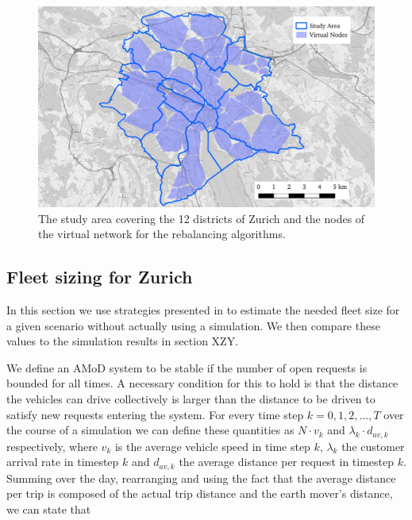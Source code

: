 \begin{figure}[h]
\begin{center}\includegraphics[width=1.0\textwidth]{figures/map.pdf}\end{center}
\caption{The study area covering the 12 districts of Zurich and the nodes of the virtual network for the rebalancing algorithms.}
\label{fig:distancePlot}
\end{figure}

\subsection{Fleet sizing for Zurich}
\label{subsec:fleetSizing}

In this section we use strategies presented in \cite{spieser2014toward} to estimate the needed fleet size for a given scenario without actually using a simulation. We then compare these values to the simulation results in section XZY.

We define an AMoD system to be stable if the number of open requests is bounded for all times. A necessary condition for this to hold is that the distance the vehicles can drive collectively is larger than the distance to be driven to satisfy new requests entering the system. For every time step $k = 0,1,2,...,T$ over the course of a simulation we can define these quantities as $N \cdot v_k$ and $ \lambda_k \cdot d_{av,k}$ respectively, where $v_k$ is the average vehicle speed in time step $k$, $\lambda_k$ the customer arrival rate in timestep $k$ and $d_{av,k}$ the average distance per request in timestep $k$. Summing over the day, rearranging and using the fact that the average distance per trip is composed of the actual trip distance and the earth mover's distance, we can state that

